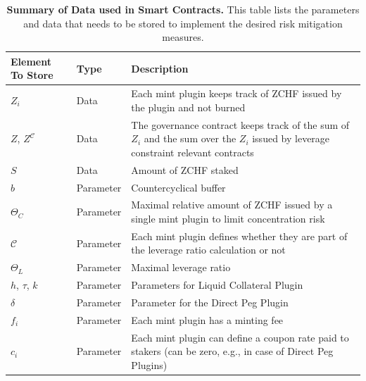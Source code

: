 \documentclass[english,11pt]{article}
\begin{document}
\begin{table}[htbp]
 \caption{\textbf{Summary of Data used in Smart Contracts.}
    This table lists the parameters and data that needs to
    be stored to implement the desired risk mitigation measures.} %
    \centering %
\begin{tabularx}{\textwidth}{llX}
\toprule
Element To Store & Type & Description \\
\midrule
$Z_i$                        & Data          & Each mint plugin keeps track of ZCHF issued by the plugin and not burned                                     \\
$Z$, $Z^{\mathcal{C}}$ & Data          & The governance contract keeps track of the sum of $Z_i$ and the sum over the $Z_i$ issued by leverage constraint relevant contracts\\
$S$                         & Data          & Amount of ZCHF staked                                                                                        \\
$b$                         & Parameter     & Countercyclical buffer                                                                                       \\
$\Theta_C$                  & Parameter     & Maximal relative amount of ZCHF issued
by a single mint plugin to limit concentration risk                                                  \\
$\mathcal{C}$               & Parameter     & Each mint plugin defines whether they are part of the leverage ratio calculation or not                      \\
$\Theta_L$                   & Parameter     & Maximal leverage ratio                                                                                       \\
$h$, $\tau$, $k$                 & Parameter     & Parameters for Liquid Collateral Plugin                                                                      \\
$\delta$     & Parameter     & Parameter for the Direct Peg Plugin                                                                          \\
$f_i$                      & Parameter     & Each mint plugin has a minting fee                                                                           \\
$c_i$                     & Parameter     & Each mint plugin can define a coupon rate paid to stakers (can be zero, e.g., in case of Direct Peg Plugins)\\
\bottomrule
\end{tabularx}\label{tab:summary}
\end{table}
\end{document}

